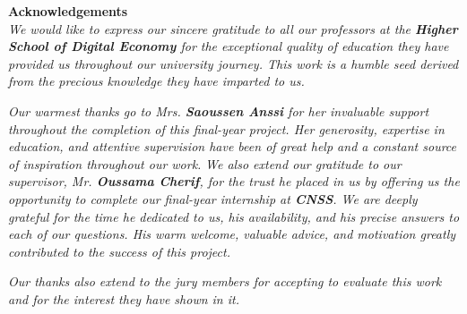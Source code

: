 \begin{center}
\doublespacing
\centering
\Large\textbf{Acknowledgements} \\
\vspace{1cm}
\textit{We would like to express our sincere gratitude to all our professors at the \textbf{ Higher School of Digital Economy} for the exceptional quality of education they have provided us throughout our university journey. This work is a humble seed derived from the precious knowledge they have imparted to us.}
\vspace{0.5cm}

\textit{Our warmest thanks go to Mrs. \textbf{Saoussen Anssi} for her invaluable support throughout the completion of this final-year project. Her generosity, expertise in education, and attentive supervision have been of great help and a constant source of inspiration throughout our work.}
\vspace{0.5cm}
\textit{We also extend our gratitude to our supervisor, Mr. \textbf{Oussama Cherif}, for the trust he placed in us by offering us the opportunity to complete our final-year internship at \textbf{CNSS}. We are deeply grateful for the time he dedicated to us, his availability, and his precise answers to each of our questions. His warm welcome, valuable advice, and motivation greatly contributed to the success of this project.}
\vspace{0.5cm}

 \textit{Our thanks also extend to the jury members for accepting to evaluate this work and for the interest they have shown in it.}
\end{center}